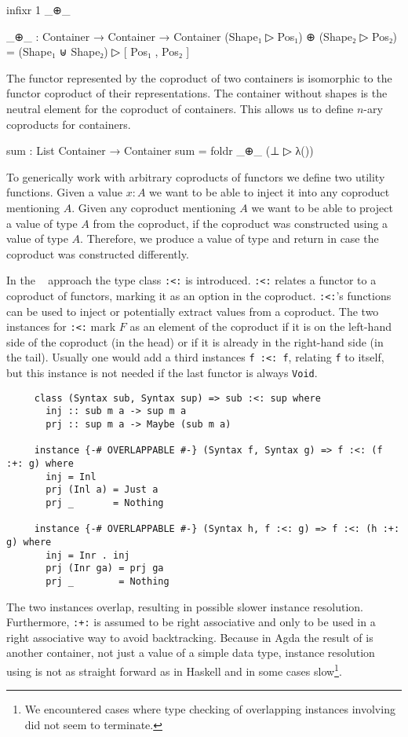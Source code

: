 \begin{code}[hide]
infixr 1 _⊕_
\end{code}
\begin{code}
_⊕_ : Container → Container → Container
(Shape₁ ▷ Pos₁) ⊕ (Shape₂ ▷ Pos₂) = (Shape₁ ⊎ Shape₂) ▷ [ Pos₁ , Pos₂ ]
\end{code}
The functor represented by the coproduct of two containers is isomorphic to the
functor coproduct of their representations.
The container without shapes is the neutral element for the coproduct of
containers.
This allows us to define $n$-ary coproducts for containers.

\begin{code}
sum : List Container → Container
sum = foldr _⊕_ (⊥ ▷ λ())
\end{code}
To generically work with arbitrary coproducts of functors we define two utility
functions.
Given a value $x:A$ we want to be able to inject it into any coproduct
mentioning $A$.
Given any coproduct mentioning $A$ we want to be able to project a value of
type $A$ from the coproduct, if the coproduct was constructed using a value of
type $A$.
Therefore, we produce a value of type
\AgdaSpace{} and return
 in case the coproduct was constructed
differently.

In the
~\cite{DBLP:journals/jfp/Swierstra08}
approach the type class \texttt{:<:} is introduced.
\texttt{:<:} relates a functor to a coproduct of functors, marking it as an
option in the coproduct.
\texttt{:<:}'s functions can be used to inject or potentially extract values
from a coproduct.
The two instances for \texttt{:<:} mark $F$ as an element of the coproduct if
it is on the left-hand side of the coproduct (in the head) or if it is already
in the right-hand side (in the tail).
Usually one would add a third instances \texttt{f :<: f}, relating \texttt{f} to
itself, but this instance is not needed if the last functor is always
\texttt{Void}.

\begin{verbatim}
     class (Syntax sub, Syntax sup) => sub :<: sup where
       inj :: sub m a -> sup m a
       prj :: sup m a -> Maybe (sub m a)

     instance {-# OVERLAPPABLE #-} (Syntax f, Syntax g) => f :<: (f :+: g) where
       inj = Inl
       prj (Inl a) = Just a
       prj _       = Nothing

     instance {-# OVERLAPPABLE #-} (Syntax h, f :<: g) => f :<: (h :+: g) where
       inj = Inr . inj
       prj (Inr ga) = prj ga
       prj _        = Nothing
\end{verbatim}
The two instances overlap, resulting in possible slower instance resolution.
Furthermore, \texttt{:+:} is assumed to be right associative and only to be
used in a right associative way to avoid backtracking.
Because in Agda the result of  is another container, not
just a value of a simple data type, instance resolution using
 is not as straight forward as in Haskell and in some cases
slow\footnote{We encountered cases where type checking of overlapping instances
  involving  did not seem to terminate.}.

